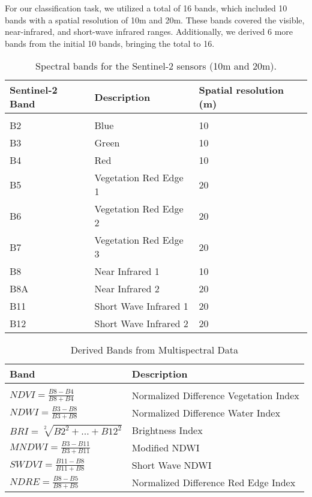 For our classification task, we utilized a total of 16 bands, which included 10 bands with a spatial resolution of 10m and 20m.
These bands covered the visible, near-infrared, and short-wave infrared ranges.
Additionally, we derived 6 more bands from the initial 10 bands, bringing the total to 16.

\begin{table}[H]
  \centering
  \begin{tabular}{lll}
    Sentinel-2 Band & Description & Spatial resolution (m) \\[0.2cm]\hline \\[-0.2cm] 
    B2 &   Blue & 10\\
    B3 &   Green  & 10\\
    B4 &   Red  & 10\\
    B5 &   Vegetation Red Edge 1  & 20\\
    B6 &   Vegetation Red Edge 2  & 20\\
    B7 &   Vegetation Red Edge 3  & 20\\
    B8 &   Near Infrared 1  & 10\\
    B8A &  Near Infrared 2  & 20\\
    B11 &  Short Wave Infrared 1  & 20\\
    B12 &  Short Wave Infrared 2  & 20\\
  \end{tabular}
  \caption{Spectral bands for the Sentinel-2 sensors (10m and 20m).\cite{wiki:sentinel2}}
  \label{tab:bands}
\end{table}

\begin{table}[H]
  \centering
  \begin{tabular}{ll}
    Band & Description \\[0.2cm]\hline \\[-0.2cm] 
    $NDVI = \frac{B8-B4}{B8+B4}$ &   Normalized Difference Vegetation Index \cite{rouse1974monitoring} \\[0.2cm]
    $NDWI = \frac{B3-B8}{B3+B8}$  & Normalized Difference Water Index \cite{doi:10.1080/01431169608948714} \\[0.2cm]
    $BRI = \sqrt[2]{B2^2 + \dots + B12^2} $  & Brightness Index  \cite{rs9010095} \\[0.2cm]
    $MNDWI = \frac{B3-B11}{B3+B11}$ &   Modified NDWI \cite{doi:10.1080/01431160600589179} \\[0.2cm]
    $SWDVI = \frac{B11-B8}{B11+B8}$ &   Short Wave NDWI \cite{1996RSEnv..58..257G}\\[0.2cm]
    $NDRE = \frac{B8-B5}{B8+B5}$ &   Normalized Difference Red Edge Index \cite{barnes2000coincident} \\[0.2cm]
  \end{tabular}
  \caption{ Derived Bands from Multispectral Data }
  \label{tab:derivedbands}
\end{table}

